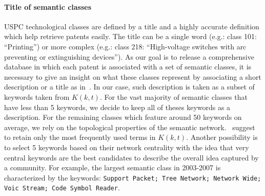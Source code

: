 \documentclass[article]{article}%
\begin{document}
\paragraph*{Title of semantic classes}
USPC technological classes are defined by a title and a highly accurate definition which help retrieve patents easily. The title can be a single word (e.g.: class 101: ``Printing'') or more complex (e.g.: class 218: ``High-voltage switches with arc preventing or extinguishing devices''). As our goal is to release a comprehensive database in which each patent is associated with a set of semantic classes, it is necessary to give an insight on what these classes represent by associating a short description or a title as in~\cite{tseng2007text}. In our case, such description is taken as a subset of keywords taken from $K(k,t)$. For the vast majority of semantic classes that have less than 5 keywords, we decide to keep all of theses keywords as a description. For the remaining classes which feature around 50 keywords on average, we rely on the topological properties of the semantic network.~\cite{yang2000improving} suggest to retain only the most frequently used terms in $K(k,t)$. Another possibility is to select 5 keywords based on their network centrality with the idea that very central keywords are the best candidates to describe the overall idea captured by a community. For example, the largest semantic class in 2003-2007 is characterized by the keywords: \texttt{Support Packet; Tree Network; Network Wide; Voic Stream; Code Symbol Reader}.
\end{document}
